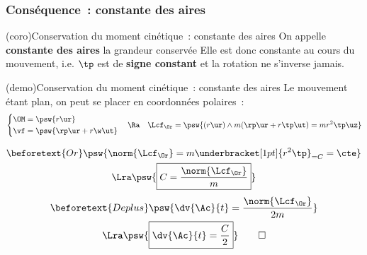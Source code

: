 \documentclass[../../main/main.tex]{subfiles}
\begin{document}
\subsubsection{Conséquence~: constante des aires}
\begin{tcb*}(coro){Conservation du moment cinétique~: constante des aires}
  On appelle \textbf{constante des aires} la grandeur conservée
  \psw{
    \[
      \boxed{C = r^{2}\tp} \Lra \dv{\Ac}{t} = \frac{C}{2}
    \]
  }
  Elle est donc constante au cours du mouvement, i.e. $\tp$ est de \textbf{signe
  constant} et la rotation ne s'inverse jamais.
\end{tcb*}
\begin{tcb*}(demo){Conservation du moment cinétique~: constante des aires}
  Le mouvement étant plan, on peut se placer en coordonnées polaires~:
  \begin{gather*}
    \left\{
    \begin{aligned}
      \OM & = \psw{r\ur}            \\
      \vf & = \psw{\rp\ur + r\w\ut}
    \end{aligned}
    \right.
    \quad\Ra\quad
    \Lcf_{\Or} = \psw{(r\ur)\wedge m(\rp\ur+r\tp\ut) = mr^2\tp\uz}
  \end{gather*}
  \begin{isd}
    \vspace{-15pt}
    \begin{gather*}
      \beforetext{Or}
      \psw{\norm{\Lcf_{\Or}} = m \underbracket[1pt]{r^{2}\tp}_{=C} = \cte}
      \\\Lra
      \psw{\boxed{C = \frac{\norm{\Lcf_{\Or}}}{m}}}
    \end{gather*}
    \tcblower
    \vspace{-15pt}
    \begin{gather*}
      \beforetext{De plus}
      \psw{\dv{\Ac}{t} = \frac{\norm{\Lcf_{\Or}}}{2m}}
      \\\Lra
      \psw{\boxed{\dv{\Ac}{t} = \frac{C}{2}}}
      \qed
    \end{gather*}
  \end{isd}
\end{tcb*}

\end{document}
